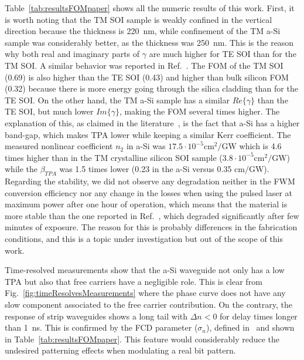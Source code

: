 Table~\ref{tab:resultsFOMpaper} shows all the numeric results of this work.
First, it is worth noting that the TM SOI sample is weakly confined in the vertical direction because the thickness is 220~nm, while confinement of the TM a-Si sample was considerably better, as the thickness was 250~nm.
This is the reason why both real and imaginary parts of $\gamma$ are much higher for TE SOI than for the TM SOI.
A similar behavior was reported in Ref.~\cite{Vallaitis2009}.
The FOM of the TM SOI (0.69) is also higher than the TE SOI (0.43) and higher than bulk silicon FOM (0.32) because there is more energy going through the silica cladding than for the TE SOI. On the other hand, the TM a-Si sample has a similar $Re\{\gamma\}$ than the TE SOI, but much lower $Im\{\gamma\}$, making the FOM several times higher.
The explanation of this, as claimed in the literature~\cite{Narayanan2010, Kuyken2011}, is the fact that a-Si has a higher band-gap, which makes TPA lower while keeping a similar Kerr coefficient.
The measured nonlinear coefficient $n_2$ in a-Si was $17.5 \cdot 10^{-5}\mathrm{cm}^2 / \mathrm{GW}$ which is 4.6 times higher than in the TM crystalline silicon SOI sample ($3.8 \cdot 10^{-5}\mathrm{cm}^2 / \mathrm{GW}$) while the $\beta_{TPA} $ was 1.5 times lower (0.23 in the a-Si versus 0.35 $\mathrm{cm} / \mathrm{GW}$).
Regarding the stability, we did not observe any degradation neither in the FWM conversion efficiency nor any change in the losses when using the pulsed laser at maximum power after one hour of operation, which means that the material is more stable than the one reported in Ref.~\cite{Kuyken2011}, which degraded significantly after few minutes of exposure.
The reason for this is probably differences in the fabrication conditions, and this is a topic under investigation but out of the scope of this work.

Time-resolved measurements show that the a-Si waveguide not only has a low TPA but also that free carriers have a negligible role. This is clear from Fig.~\ref{fig:timeResolvesMeasurements} where the phase curve does not have any slow component associated to the free carrier contribution. On the contrary, the response of strip waveguides shows a long tail with $\Delta n <0$ for delay times longer than 1~ns. This is confirmed by the FCD parameter ($\sigma_n$), defined in~\cite{Lin2007} and shown in Table~\ref{tab:resultsFOMpaper}. This feature would considerably reduce the undesired patterning effects when modulating a real bit pattern.


